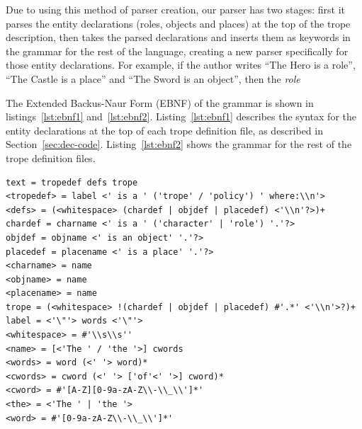\documentclass[11pt]{report}
\begin{document}
Due to using this method of parser creation, our parser has two stages: first it
parses the entity declarations (roles, objects and places) at the top of the
trope description, then takes the parsed declarations and inserts them as
keywords in the grammar for the rest of the language, creating a new parser
specifically for those entity declarations. For example, if the author writes
``The Hero is a role'', ``The Castle is a place'' and ``The Sword is an
object'', then the \emph{role} 


The Extended Backus-Naur Form (EBNF) of the grammar is shown in
listings~\ref{lst:ebnf1} and~\ref{lst:ebnf2}. Listing~\ref{lst:ebnf1} describes
the syntax for the entity declarations at the top of each trope definition file,
as described in Section~\ref{sec:dec-code}. Listing~\ref{lst:ebnf2} shows the
grammar for the rest of the trope definition files.

\begin{lstlisting}[showstringspaces=false,label={lst:ebnf1},caption={EBNF
grammar for the entity declarations in TropICAL}]
text = tropedef defs trope
<tropedef> = label <' is a ' ('trope' / 'policy') ' where:\\n'>
<defs> = (<whitespace> (chardef | objdef | placedef) <'\\n'?>)+
chardef = charname <' is a ' ('character' | 'role') '.'?>
objdef = objname <' is an object' '.'?>
placedef = placename <' is a place' '.'?>
<charname> = name
<objname> = name
<placename> = name
trope = (<whitespace> !(chardef | objdef | placedef) #'.*' <'\\n'>?)+
label = <'\"'> words <'\"'>
<whitespace> = #'\\s\\s''
<name> = [<'The ' / 'the '>] cwords
<words> = word (<' '> word)*
<cwords> = cword (<' '> ['of'<' '>] cword)*
<cword> = #'[A-Z][0-9a-zA-Z\\-\\_\\']*'
<the> = <'The ' | 'the '>
<word> = #'[0-9a-zA-Z\\-\\_\\']*'
\end{lstlisting}
\end{document}
